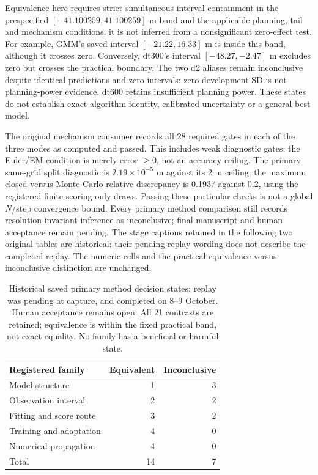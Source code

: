 Equivalence here requires strict simultaneous-interval containment in the
prespecified $[-41.100259,41.100259]$ m band and the applicable planning,
tail and mechanism conditions; it is not inferred from a nonsignificant
zero-effect test. For example, GMM's saved interval $[-21.22,16.33]$ m is
inside this band, although it crosses zero. Conversely, dt300's interval
$[-48.27,-2.47]$ m excludes zero but crosses the practical boundary.
The two d2 aliases remain inconclusive despite identical predictions and
zero intervals: zero development SD is not planning-power evidence.
dt600 retains insufficient planning power. These states do not establish
exact algorithm identity, calibrated uncertainty or a general best model.

The original mechanism consumer records all 28 required gates in each of
the three modes as computed and passed. This includes weak diagnostic gates:
the Euler/EM condition is merely error $\geq0$, not an accuracy ceiling.
The primary same-grid split diagnostic is $2.19\times10^{-5}$ m against its
2 m ceiling; the maximum closed-versus-Monte-Carlo relative discrepancy is
0.1937 against 0.2, using the registered finite scoring-only draws.
Passing these particular checks is not a global $N$/step convergence bound.
Every primary method comparison still records resolution-invariant inference
as inconclusive; final manuscript and human acceptance remain pending.
The stage captions retained in the following two original tables are historical:
their pending-replay wording does not describe the completed replay. The numeric
cells and the practical-equivalence versus inconclusive distinction are unchanged.

\begin{table}[htbp]
\centering\small
\caption{Historical saved primary method decision states: replay was pending
at capture, and completed on 8--9 October. Human acceptance remains open.
All 21 contrasts are retained; equivalence is within the fixed practical
band, not exact equality. No family has a beneficial or harmful state.}
\label{tab:saved-analysis-states}\hypertarget{tab:saved-analysis-states}{}
\begin{tabular}{@{}lrr@{}}
\toprule
Registered family & Equivalent & Inconclusive\\
\midrule
Model structure & 1 & 3\\
Observation interval & 2 & 2\\
Fitting and score route & 3 & 2\\
Training and adaptation & 4 & 0\\
Numerical propagation & 4 & 0\\
Total & 14 & 7\\
\bottomrule
\end{tabular}
\end{table}

